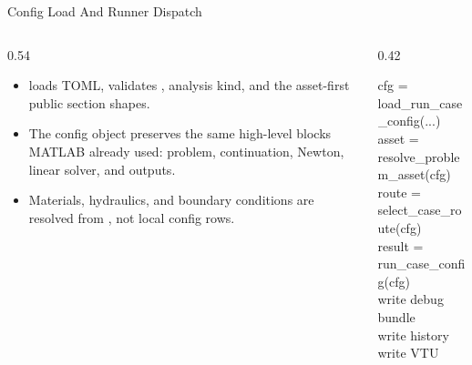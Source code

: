 \documentclass[aspectratio=169,10pt]{beamer}
\begin{document}
\begin{frame}{Config Load And Runner Dispatch}
\small
\begin{columns}[T,totalwidth=\textwidth]
\begin{column}{0.54\textwidth}
\begin{softbox}
\begin{itemize}
  \item {} loads TOML, validates , analysis kind, and the asset-first public section shapes.
  \item The config object preserves the same high-level blocks MATLAB already used: problem, continuation, Newton, linear solver, and outputs.
  \item Materials, hydraulics, and boundary conditions are resolved from , not local config rows.
\end{itemize}
\end{softbox}
\end{column}
\begin{column}{0.42\textwidth}
\begin{pseudobox}
cfg = load\_run\_case\_config(...)\\
asset = resolve\_problem\_asset(cfg)\\
route = select\_case\_route(cfg)\\
result = run\_case\_config(cfg)\\
write debug bundle\\
write history\\
write VTU
\end{pseudobox}
\end{column}
\end{columns}
\end{frame}
\end{document}
